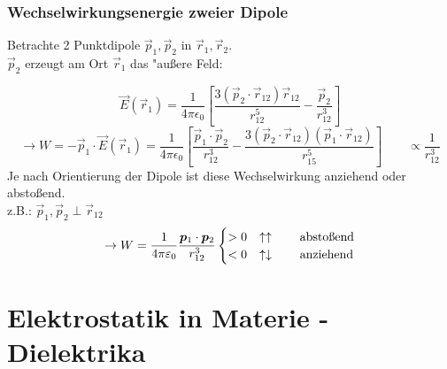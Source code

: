 \noindent
\begin{minipage}{.5\linewidth}
	
	\subsubsection{Wechselwirkungsenergie zweier Dipole}
	
	Betrachte 2 Punktdipole $\vec{p}_1,\vec{p}_2$ in $\vec{r}_1,\vec{r}_2$.\\
	$\vec{p}_2$ erzeugt am Ort $\vec{r}_1$ das "au\ss ere Feld:
\end{minipage}%
\begin{minipage}{.5\linewidth}
	\centering
	\vspace{10pt}
\end{minipage}%
\[\vec{E}(\vec{r}_1)=\frac{1}{4\pi\epsilon_0}\left[\frac{3(\vec{p}_2\cdot\vec{r}_{12})\vec{r}_{12}}{r_{12}^5}-\frac{\vec{p}_2}{r_{12}^3}\right]\]
\[\rightarrow W=-\vec{p}_1\cdot\vec{E}(\vec{r}_1)=\frac{1}{4\pi\epsilon_0}\left[\frac{\vec{p}_1\cdot\vec{p}_2}{r_{12}^3}-\frac{3(\vec{p}_2\cdot\vec{r}_{12})(\vec{p}_1\cdot\vec{r}_{12})}{r_{15}^5}\right] \qquad \propto\frac{1}{r_{12}^3}\]
Je nach Orientierung der Dipole ist diese Wechselwirkung anziehend oder absto\ss end.\\
z.B.: $\vec{p}_1,\vec{p}_2\perp\vec{r}_{12}$
\[\rightarrow W=\frac{1}{4\pi\varepsilon_0}\frac{\bm{p}_1\cdot\bm{p}_2}{r_{12}^3}\begin{cases}>0&\uparrow\uparrow \qquad \textrm{abstoßend}\\<0&\uparrow\downarrow \qquad \textrm{anziehend}\end{cases}\]



\section{Elektrostatik in Materie - Dielektrika}

